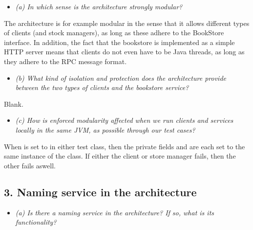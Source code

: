 \begin{itemize}
  \item \textit{(a) In which sense is the architecture strongly modular?}
\end{itemize}

\noindent The architecture is for example modular in the sense that it allows different
types of clients (and stock managers), as long as these adhere to the BookStore
interface. In addition, the fact that the bookstore is implemented as a simple
HTTP server means that clients do not even have to be Java threads, as long as
they adhere to the RPC message format.

\begin{itemize}
  \item \textit{(b) What kind of isolation and protection does the architecture
    provide between the two types of clients and the bookstore service?}
\end{itemize}

Blank.


\begin{itemize}
  \item \textit{(c) How is enforced modularity affected when we run clients and
    services locally in the same JVM, as possible through our test cases?}
\end{itemize}

\noindent When  is set to  in either test class, then the private
fields  and  are each set to the same instance of
the  class. If either the client or store manager fails,
then the other fails aswell.

\streg

\newpage

\subsection{3. Naming service in the architecture}

\begin{itemize}
  \item \textit{(a) Is there a naming service in the architecture? If so, what is its
  functionality?}
\end{itemize}

